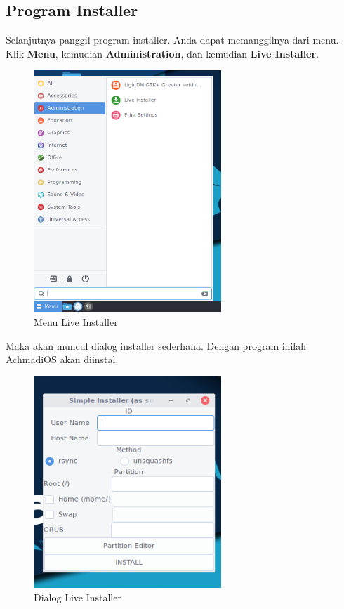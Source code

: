 \documentclass[12pt,]{article}
\begin{document}
	\newpage
	\subsection{Program Installer}
	Selanjutnya panggil program installer.
	Anda dapat memanggilnya dari menu.
	Klik \textbf{Menu}, kemudian \textbf{Administration}, dan kemudian \textbf{Live Installer}. 
	
	\begin{figure}[!ht]
		\centering
		\includegraphics[width=200pt]{installhdd/step_4}
		\caption{Menu Live Installer}
	\end{figure}

	Maka akan muncul dialog installer sederhana.
	Dengan program inilah AchmadiOS akan diinstal.
	
	\begin{figure}[!ht]
		\centering
		\includegraphics[width=200pt]{installhdd/step_5}
		\caption{Dialog Live Installer}
	\end{figure}   
	
\end{document}
